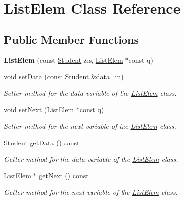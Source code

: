 \hypertarget{class_list_elem}{}\section{List\+Elem Class Reference}
\label{class_list_elem}
\subsection*{Public Member Functions}
\begin{DoxyCompactItemize}
\item 
\mbox{\label{class_list_elem_a8af09a0cc566daa92cc4e7af43e3089c}} 
{\bfseries List\+Elem} (const \hyperlink{class_student}{Student} \&s, \hyperlink{class_list_elem}{List\+Elem} $\ast$const q)
\item 
void \hyperlink{class_list_elem_a2eece4a9fa40234ee6529c0b50480694}{set\+Data} (const \hyperlink{class_student}{Student} \&data\+\_\+in)
\begin{DoxyCompactList}\small\item\em Setter method for the \textquotesingle{}data\textquotesingle{} variable of the \hyperlink{class_list_elem}{List\+Elem} class. \end{DoxyCompactList}\item 
void \hyperlink{class_list_elem_a8dcd5f6f4d561bb0e4c9c5431f550caf}{set\+Next} (\hyperlink{class_list_elem}{List\+Elem} $\ast$const q)
\begin{DoxyCompactList}\small\item\em Setter method for the \textquotesingle{}next\textquotesingle{} variable of the \hyperlink{class_list_elem}{List\+Elem} class. \end{DoxyCompactList}\item 
\hyperlink{class_student}{Student} \hyperlink{class_list_elem_af80ce8c80d9e4dfa450d9272c965e110}{get\+Data} () const
\begin{DoxyCompactList}\small\item\em Getter method for the \textquotesingle{}data\textquotesingle{} variable of the \hyperlink{class_list_elem}{List\+Elem} class. \end{DoxyCompactList}\item 
\hyperlink{class_list_elem}{List\+Elem} $\ast$ \hyperlink{class_list_elem_ac615618c96d2bacc597ba59a4e8e2620}{get\+Next} () const
\begin{DoxyCompactList}\small\item\em Getter method for the \textquotesingle{}next\textquotesingle{} variable of the \hyperlink{class_list_elem}{List\+Elem} class. \end{DoxyCompactList}\end{DoxyCompactItemize}


